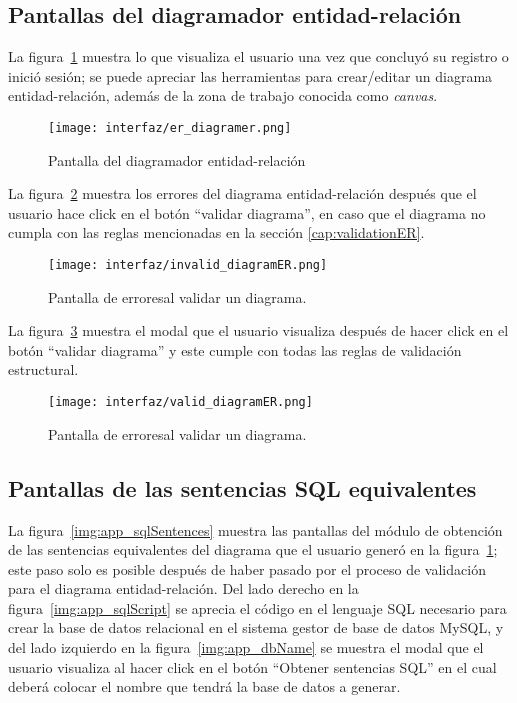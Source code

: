 \subsection*{Pantallas del diagramador entidad-relación}

La figura~\ref{img:app_diagrammerER} muestra lo que visualiza el usuario una vez que concluyó su registro o inició sesión; se puede apreciar las herramientas para crear/editar un diagrama entidad-relación, además de la zona de trabajo conocida como \textit{canvas}.

\begin{figure}[H]
    \centering
    \texttt{[image: interfaz/er\_diagramer.png]}
    \caption{Pantalla del diagramador entidad-relación}
    \label{img:app_diagrammerER}
\end{figure}


La figura~\ref{img:app_errorDiagram} muestra los errores del diagrama entidad-relación después que el usuario hace click en el  botón ``validar diagrama'', en caso que el diagrama no cumpla con las reglas mencionadas en la sección \ref{cap:validationER}.

\begin{figure}[H]
    \centering
    \texttt{[image: interfaz/invalid\_diagramER.png]}
    \caption{Pantalla de erroresal validar un diagrama.}
    \label{img:app_errorDiagram}
\end{figure}

La figura~\ref{img:app_validDiagram} muestra el modal que el usuario visualiza después de hacer click en el botón ``validar diagrama'' y este cumple con todas las reglas de validación estructural.

\begin{figure}[H]
    \centering
    \texttt{[image: interfaz/valid\_diagramER.png]}
    \caption{Pantalla de erroresal validar un diagrama.}
    \label{img:app_validDiagram}
\end{figure}

\subsection*{Pantallas de las sentencias SQL equivalentes}

La figura~\ref{img:app_sqlSentences} muestra las pantallas del módulo de obtención de las sentencias equivalentes del diagrama que el usuario generó en la figura~\ref{img:app_diagrammerER}; este paso solo es posible después de haber pasado por el proceso de validación para el diagrama entidad-relación.
Del lado derecho en la figura~\ref{img:app_sqlScript} se aprecia el código en el lenguaje SQL necesario para crear la base de datos relacional en el sistema gestor de base de datos MySQL, y del lado izquierdo en la figura~\ref{img:app_dbName} se muestra el modal que el usuario visualiza al hacer click en el botón ``Obtener sentencias SQL'' en el cual deberá colocar el nombre que tendrá la base de datos a generar.

